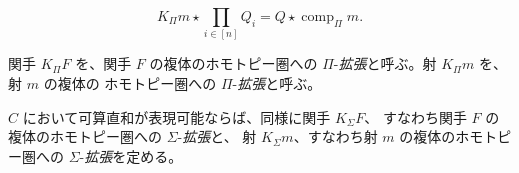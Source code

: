 \begin{equation}
  K_{\Pi}m\star\prod_{i\in[n]}Q_i
  =Q\star\operatorname{comp}_{\Pi}m.
  \tag{2.5.10.4}
\end{equation}

関手 $K_{\Pi}F$ を、関手 $F$ の複体のホモトピー圏への
$\Pi$-\emph{拡張}と呼ぶ。射 $K_{\Pi}m$ を、射 $m$ の複体の
ホモトピー圏への $\Pi$-\emph{拡張}と呼ぶ。

$C$ において可算直和が表現可能ならば、同様に関手 $K_{\Sigma}F$、
すなわち関手 $F$ の複体のホモトピー圏への $\Sigma$-\emph{拡張}と、
射 $K_{\Sigma}m$、すなわち射 $m$ の複体のホモトピー圏への
$\Sigma$-\emph{拡張}を定める。
